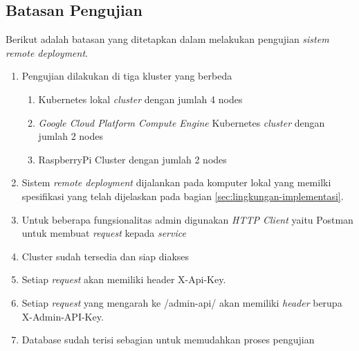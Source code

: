 \subsection{Batasan Pengujian}
Berikut adalah batasan yang ditetapkan dalam melakukan pengujian \textit{sistem remote deployment}.

\begin{enumerate}
  \item Pengujian dilakukan di tiga kluster yang berbeda
        \begin{enumerate}
          \item Kubernetes lokal \textit{cluster} dengan jumlah 4 nodes
          \item \textit{Google Cloud Platform Compute Engine} Kubernetes \textit{cluster} dengan jumlah 2 nodes
          \item RaspberryPi Cluster dengan jumlah 2 nodes
        \end{enumerate}
  \item Sistem \textit{remote deployment} dijalankan pada komputer lokal yang memilki spesifikasi yang telah dijelaskan pada bagian \ref{sec:lingkungan-implementasi}.
  \item Untuk beberapa fungsionalitas admin digunakan \textit{HTTP Client} yaitu Postman untuk membuat \textit{request} kepada \textit{service}
  \item Cluster sudah tersedia dan siap diakses
  \item Setiap \textit{request} akan memiliki header X-Api-Key.
  \item Setiap \textit{request} yang mengarah ke /admin-api/ akan memiliki \textit{header} berupa X-Admin-API-Key.
  \item Database sudah terisi sebagian untuk memudahkan proses pengujian
\end{enumerate}